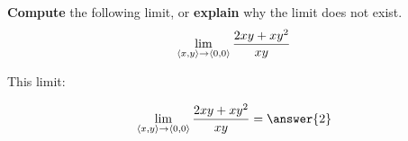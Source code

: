 \documentclass{ximera}
\begin{document}
\begin{problem} \textbf{Compute} the following limit, or \textbf{explain} why the limit does not exist.
  \[
  \lim_{\left\langle x,y\right\rangle\to \left\langle 0,0\right\rangle} \frac{2x y + xy^2}{x y}
  \]
  \begin{prompt}
    This limit:
    \begin{multipleChoice}
    \end{multipleChoice}
    \begin{problem}
      \[
      \lim_{\vector{x,y}\to \vector{0,0}} \frac{2x y + xy^2}{x y}=\answer{2}
      \]
    \end{problem}
  \end{prompt}
  \vfill
\end{problem}
\end{document}
